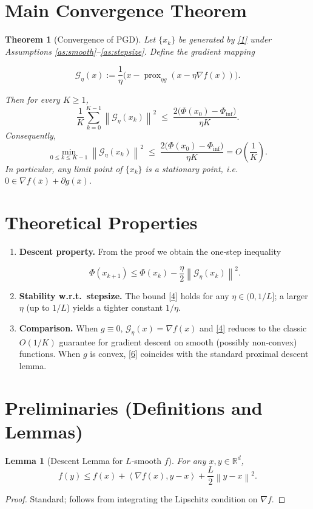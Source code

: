 \documentclass{article}
\newtheorem{theorem}{Theorem}
\newtheorem{lemma}{Lemma}
\newcommand{\prox}{\operatorname{prox}}
\newcommand{\grad}{\nabla}
\newcommand{\R}{\mathbb{R}}
\newcommand{\norm}[1]{\left\|#1\right\|}
\newcommand{\inner}[2]{\left\langle #1,#2\right\rangle}
\begin{document}
\section*{Main Convergence Theorem}
\begin{theorem}[Convergence of PGD]\label{thm:main}
Let $\{x_k\}$ be generated by \eqref{1} under Assumptions \ref{as:smooth}–\ref{as:stepsize}.  
Define the \emph{gradient mapping}  

\[
\mathcal{G}_{\eta}(x):=\frac{1}{\eta}\bigl(x-\prox_{\eta g}(x-\eta\grad f(x))\bigr).
\tag{3}
\]

Then for every $K\ge1$,
\[
\frac{1}{K}\sum_{k=0}^{K-1}\norm{\mathcal{G}_{\eta}(x_k)}^{2}
\;\le\;
\frac{2\bigl(\Phi(x_0)-\Phi_{\inf}\bigr)}{\eta K}.
\tag{4}
\]
Consequently,
\[
\min_{0\le k\le K-1}\norm{\mathcal{G}_{\eta}(x_k)}^{2}
\;\le\;
\frac{2\bigl(\Phi(x_0)-\Phi_{\inf}\bigr)}{\eta K}
=O\!\left(\frac{1}{K}\right).
\tag{5}
\]
In particular, any limit point of $\{x_k\}$ is a \emph{stationary point}, i.e. $0\in\grad f(\bar x)+\partial g(\bar x)$.
\end{theorem}

\section*{Theoretical Properties}
\begin{enumerate}[label=\arabic*.]
\item \textbf{Descent property.} From the proof we obtain the one‑step inequality  

\[
\Phi(x_{k+1})\le \Phi(x_k)-\frac{\eta}{2}\norm{\mathcal{G}_{\eta}(x_k)}^{2}.
\tag{6}
\]

\item \textbf{Stability w.r.t.\ stepsize.} The bound \eqref{4} holds for any $\eta\in(0,1/L]$; a larger $\eta$ (up to $1/L$) yields a tighter constant $1/\eta$.

\item \textbf{Comparison.} When $g\equiv0$, $\mathcal{G}_{\eta}(x)=\grad f(x)$ and \eqref{4} reduces to the classic $O(1/K)$ guarantee for gradient descent on smooth (possibly non‑convex) functions.  
When $g$ is convex, \eqref{6} coincides with the standard proximal descent lemma.

\end{enumerate}

\section*{Preliminaries (Definitions and Lemmas)}
\begin{lemma}[Descent Lemma for $L$‑smooth $f$]\label{lem:descent}
For any $x,y\in\R^{d}$,
\[
f(y)\le f(x)+\inner{\grad f(x)}{y-x}+\frac{L}{2}\norm{y-x}^{2}.
\tag{7}
\]
\end{lemma}
\begin{proof}
Standard; follows from integrating the Lipschitz condition on $\grad f$.
\end{proof}
\end{document}
